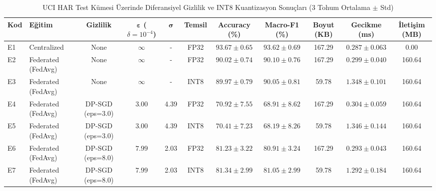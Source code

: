 \begin{table}[htbp]
\centering
\caption{UCI HAR Test Kümesi Üzerinde Diferansiyel Gizlilik ve INT8 Kuantizasyon Sonuçları (3 Tohum Ortalama $\pm$ Std)}
\label{tab:main_results}
\begin{tabular}{llccccccccc}
\hline
\textbf{Kod} & \textbf{Eğitim} & \textbf{Gizlilik} & $\boldsymbol{\varepsilon}$ ($\delta=10^{-4}$) & $\boldsymbol{\sigma}$ & \textbf{Temsil} & \textbf{Accuracy (\%)} & \textbf{Macro-F1 (\%)} & \textbf{Boyut (KB)} & \textbf{Gecikme (ms)} & \textbf{İletişim (MB)} \\
\hline
E1 & Centralized & None & $\infty$ & - & FP32 & $93.67 \pm 0.65$ & $93.62 \pm 0.69$ & 167.29 & $0.287 \pm 0.063$ & 0.00 \\
E2 & Federated (FedAvg) & None & $\infty$ & - & FP32 & $90.02 \pm 0.74$ & $90.10 \pm 0.76$ & 167.29 & $0.299 \pm 0.040$ & 160.64 \\
E3 & Federated (FedAvg) & None & $\infty$ & - & INT8 & $89.97 \pm 0.79$ & $90.05 \pm 0.81$ & 59.78 & $1.348 \pm 0.101$ & 160.64 \\
E4 & Federated (FedAvg) & DP-SGD (eps=3.0) & $3.00$ & 4.39 & FP32 & $70.92 \pm 7.55$ & $68.91 \pm 8.62$ & 167.29 & $0.304 \pm 0.059$ & 160.64 \\
E5 & Federated (FedAvg) & DP-SGD (eps=3.0) & $3.00$ & 4.39 & INT8 & $70.41 \pm 7.23$ & $68.19 \pm 8.26$ & 59.78 & $1.346 \pm 0.144$ & 160.64 \\
E6 & Federated (FedAvg) & DP-SGD (eps=8.0) & $7.99$ & 2.03 & FP32 & $81.23 \pm 3.22$ & $80.91 \pm 3.24$ & 167.29 & $0.293 \pm 0.043$ & 160.64 \\
E7 & Federated (FedAvg) & DP-SGD (eps=8.0) & $7.99$ & 2.03 & INT8 & $81.34 \pm 2.99$ & $81.05 \pm 2.99$ & 59.78 & $1.292 \pm 0.184$ & 160.64 \\
\hline
\end{tabular}
\end{table}
